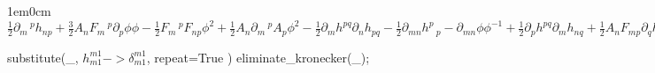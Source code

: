 \documentclass[12pt,a4paper,svgnames]{extarticle}
\begin{document}
\begin{adjustwidth}{1em}{0cm}${}\frac{1}{2}\partial_{m}\,^{p}{h_{n p}}+\frac{3}{2}A_{n} F_{m}\,^{p} \partial_{p}{\phi} \phi - \frac{1}{2}F_{m}\,^{p} F_{n p} {\phi}^{2}+\frac{1}{2}A_{n} \partial_{m}\,^{p}{A_{p}} {\phi}^{2} - \frac{1}{2}\partial_{m}{h^{p q}} \partial_{n}{h_{p q}} - \frac{1}{2}\partial_{m n}{h^{p}\,_{p}}-\partial_{m n}{\phi} {\phi}^{-1}+\frac{1}{2}\partial_{p}{h^{p q}} \partial_{m}{h_{n q}}+\frac{1}{2}A_{n} F_{m p} \partial_{q}{h^{p q}} {\phi}^{2}+\frac{1}{2}\partial_{n}{h_{m p}} \partial_{q}{h^{p q}}+\frac{1}{2}A_{m} F_{n p} \partial_{q}{h^{p q}} {\phi}^{2}+\frac{1}{2}\partial_{n}\,^{p}{h_{m p}}+\frac{3}{2}A_{m} F_{n}\,^{p} \partial_{p}{\phi} \phi+\frac{1}{2}A_{m} \partial_{n}\,^{p}{A_{p}} {\phi}^{2} - \frac{1}{2}\partial_{p}{h_{m n}} \partial_{q}{h^{p q}}-A_{m} A_{n} \partial_{p}{\phi} \partial_{q}{h^{p q}} \phi - \frac{1}{2}\partial^{p}\,_{p}{h_{m n}}-A_{m} A_{n} \partial^{p}\,_{p}{\phi} \phi - \frac{1}{2}A_{n} \partial^{p}\,_{p}{A_{m}} {\phi}^{2}%
 - \frac{1}{2}A_{m} \partial^{p}\,_{p}{A_{n}} {\phi}^{2} - \frac{1}{2}\partial^{p}{h_{m}\,^{r}} \partial_{r}{h_{n p}}+\frac{1}{2}A_{n} F^{p r} \partial_{p}{h_{m r}} {\phi}^{2}+\frac{1}{2}A_{m} F^{p r} \partial_{p}{h_{n r}} {\phi}^{2}+\frac{1}{4}A_{m} A_{n} F^{p r} F_{p r} {\phi}^{4}+\frac{1}{2}\partial^{p}{h_{m}\,^{r}} \partial_{p}{h_{n r}} - \frac{1}{4}\partial_{m}{h^{p r}} \partial_{n}{h_{p r}}+\frac{1}{4}\partial_{m}{h_{n}\,^{p}} \partial_{p}{h^{r}\,_{r}}+\frac{1}{4}A_{n} F_{m}\,^{p} \partial_{p}{h^{r}\,_{r}} {\phi}^{2}+\frac{1}{2}\partial^{p}{\phi} \partial_{m}{h_{n p}} {\phi}^{-1}+\frac{1}{4}\partial_{n}{h_{m}\,^{p}} \partial_{p}{h^{r}\,_{r}}+\frac{1}{4}A_{m} F_{n}\,^{p} \partial_{p}{h^{r}\,_{r}} {\phi}^{2}+\frac{1}{2}\partial^{p}{\phi} \partial_{n}{h_{m p}} {\phi}^{-1} - \frac{1}{4}\partial^{p}{h_{m n}} \partial_{p}{h^{r}\,_{r}} - \frac{1}{2}A_{m} A_{n} \partial^{p}{\phi} \partial_{p}{h^{r}\,_{r}} \phi - \frac{1}{2}\partial^{p}{\phi} \partial_{p}{h_{m n}} {\phi}^{-1}$\end{adjustwidth}
\begin{python}
substitute(_, $h^{m1}_{m1} -> \delta^{m1}_{m1}$, repeat=True )
eliminate_kronecker(_);
\end{python}
\end{document}

